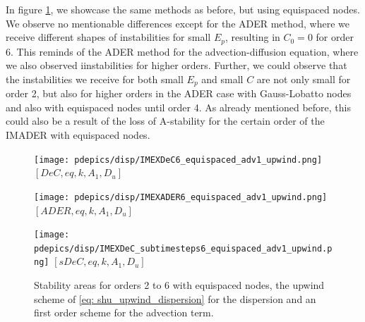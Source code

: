 In figure \ref{fig: disp_allRK_EQ}, we showcase the same methods as before, but using equispaced nodes. We observe no mentionable differences except for the ADER method, where we receive different shapes of instabilities for small $E_p$, resulting in $C_0=0$ for order 6. This reminds of the ADER method for the advection-diffusion equation, where we also observed iinstabilities for higher orders.  Further, we could observe that the instabilities we receive for both small $E_p$ and small $C$ are not only small for order 2, but also for higher orders in the ADER case with Gauss-Lobatto nodes and also with equispaced nodes until order 4.  As already mentioned before, this could also be a result of the loss of A-stability for the certain order of the IMADER with equispaced nodes. 
\begin{figure}
	\begin{minipage}[t]{0.32\textwidth}
		\centering
		\texttt{[image: pdepics/disp/IMEXDeC6\_equispaced\_adv1\_upwind.png]}
		\small$[DeC, eq,k,A_1,D_u]$\par
	\end{minipage}
	\begin{minipage}[t]{0.32\textwidth}
		\centering
		\texttt{[image: pdepics/disp/IMEXADER6\_equispaced\_adv1\_upwind.png]}
		\small$[ADER, eq,k, A_1,D_u]$\par
	\end{minipage}
	\begin{minipage}[t]{0.32\textwidth}
		\centering
		\texttt{[image: pdepics/disp/IMEXDeC\_subtimesteps6\_equispaced\_adv1\_upwind.png]}
		\small$[sDeC, eq,k, A_1,D_u]$\par
	\end{minipage}
	\caption{Stability areas for orders 2 to 6 with equispaced nodes, the upwind scheme of \eqref{eq: shu_upwind_dispersion} for the dispersion and an first order scheme for the advection term.}
	\label{fig: disp_allRK_EQ}
\end{figure}


